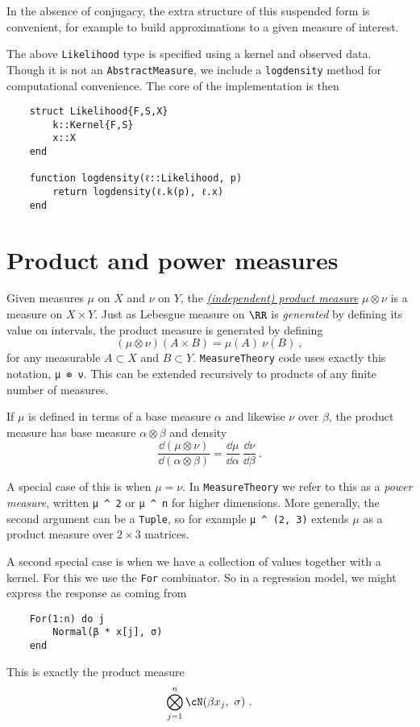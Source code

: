 \documentclass{juliacon}
\begin{document}
In the absence of conjugacy, the extra structure of this suspended form is convenient, for example to build approximations to a given measure of interest.

The above \verb|Likelihood| type is specified using a kernel and observed data. Though it is not an \verb|AbstractMeasure|, we include a \verb|logdensity| method for computational convenience. The core of the implementation is then
\begin{verbatim}
    struct Likelihood{F,S,X}
        k::Kernel{F,S}
        x::X
    end

    function logdensity(ℓ::Likelihood, p) 
        return logdensity(ℓ.k(p), ℓ.x)
    end
\end{verbatim}

\section{Product and power measures}

Given measures $\mu$ on $X$ and $\nu$ on $Y$, the \href{https://en.wikipedia.org/wiki/Product_measure}{\emph{(independent) product measure}} $\mu \otimes \nu$ is a measure on $X\times Y$. Just as Lebesgue measure on $\RR$ is \emph{generated} by defining its value on intervals, the product measure is generated by defining
\[
(\mu \otimes \nu)(A\times B) = \mu(A)\ \nu(B)\ ,
\]
for any measurable $A\subset X$ and $B\subset Y$. \verb|MeasureTheory| code uses exactly this notation, \verb|μ ⊗ ν|. This can be extended recursively to products of any finite number of measures.

If $\mu$ is defined in terms of a base measure $\alpha$ and likewise $\nu$ over $\beta$, the product measure has base measure $\alpha \otimes \beta$ and density
\[
\frac{\dd(\mu \otimes \nu)}{\dd(\alpha \otimes \beta)} = \frac{\dd\mu}{\dd\alpha}\ \frac{\dd\nu}{\dd\beta}\ .
\]



A special case of this is when $\mu = \nu$. In \verb|MeasureTheory| we refer to this as a \emph{power measure}, written \verb|μ ^ 2| or \verb|μ ^ n| for higher dimensions. More generally, the second argument can be a \verb|Tuple|, so for example \verb|μ ^ (2, 3)| extends $\mu$ as a product measure over $2\times 3$ matrices.

A second special case is when we have a collection of values together with a kernel. For this we use the \verb|For| combinator. So in a regression model, we might express the response as coming from
\begin{verbatim}
    For(1:n) do j  
        Normal(β * x[j], σ)
    end
\end{verbatim}
This is exactly the product measure
\[
\bigotimes_{j=1}^n \cN(\beta x_j,\ \sigma)\ .
\]
\end{document}

